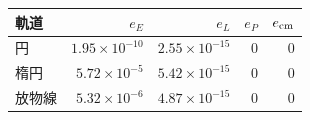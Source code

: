 \begin{tabular}{lrrrr}\toprule
軌道 & $e_E$ & $e_L$ & $e_P$ & $e_{\rm cm}$ \\
\midrule
円 & $1.95\times 10^{-10}$ & $2.55\times 10^{-15}$ & $0$ & $0$ \\
楕円 & $5.72\times 10^{-5}$ & $5.42\times 10^{-15}$ & $0$ & $0$ \\
放物線 & $5.32\times 10^{-6}$ & $4.87\times 10^{-15}$ & $0$ & $0$ \\
\bottomrule\end{tabular}
